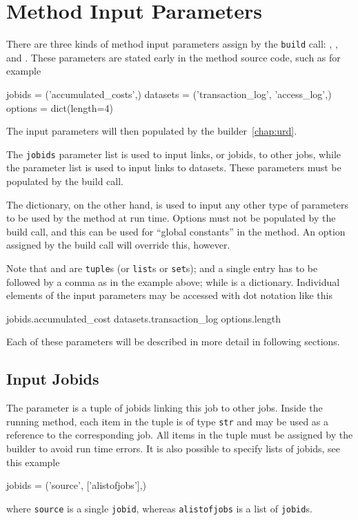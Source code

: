 \section{Method Input Parameters}
\label{sec:input_params}

There are three kinds of method input parameters assign by
the \texttt{build} call: \jobids, \datasets, and \options.  These
parameters are stated early in the method source code, such as for
example
\begin{python}
jobids = ('accumulated_costs',)
datasets = ('transaction_log', 'access_log',)
options = dict(length=4)
\end{python}
The input parameters will then populated by the
builder~\ref{chap:urd}.

The \texttt{jobids} parameter list is used to input links, or jobids,
to other jobs, while the \datasets parameter list is used to input
links to datasets.  These parameters must be populated by the build
call.

The \options dictionary, on the other hand, is used to input any other
type of parameters to be used by the method at run time.  Options must
not be populated by the build call, and this can be used for ``global
constants'' in the method.  An option assigned by the build call will
override this, however.

Note that \jobids and \datasets are \texttt{tuple}s (or \texttt{list}s
or \texttt{set}s); and a single entry has to be followed by a comma as
in the example above; while \options is a dictionary.  Individual
elements of the input parameters may be accessed with dot notation
like this
\begin{python}
jobids.accumulated_cost
datasets.transaction_log
options.length
\end{python}
Each of these parameters will be described in more detail in following
sections.




\subsection*{Input Jobids}
The \jobids parameter is a tuple of jobids linking this job to other
jobs.  Inside the running method, each item in the \jobids tuple is of
type \texttt{str} and may be used as a reference to the corresponding
job.  All items in the \jobids tuple must be assigned by the builder to
avoid run time errors.
It is also possible to specify lists of jobids, see this example
\begin{python}
jobids = ('source', ['alistofjobs'],)
\end{python}
where \texttt{source} is a single \texttt{jobid}, whereas
\texttt{alistofjobs} is a list of \texttt{jobid}s.



